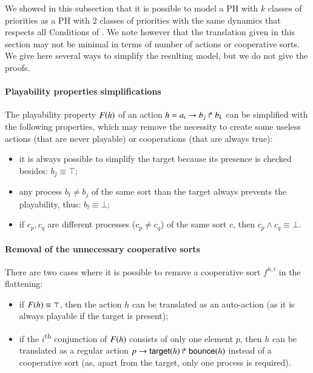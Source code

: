 We showed in this subsection that it is possible to model a PH with $k$ classes of priorities as a PH
with $2$ classes of priorities with the same dynamics that respects all Conditions of .
We note however that the translation given in this section may not be minimal in terms of number of actions
or cooperative sorts.
We give here several ways to simplify the resulting model, but we do not give the proofs.

\paragraph{Playability properties simplifications}
The playability property $F(h)$ of an action $h = a_i\rightarrow b_j\Rsh b_k$ can be simplified with the following properties,
which may remove the necessity to create some useless actions (that are never playable) or cooperations (that are always true):
\begin{itemize}
  \item it is always possible to simplify the target because its presence is checked besides: $b_j \equiv \top$;
  \item any process $b_l \neq b_j$ of the same sort than the target always prevents the playability, thus: $b_l \equiv \bot$;
  \item if $c_p, c_q$ are different processes ($c_p \neq c_q$) of the same sort $c$, then $c_p \wedge c_q \equiv \bot$.
\end{itemize}

\paragraph{Removal of the unnecessary cooperative sorts}
There are two cases where it is possible to remove a cooperative sort $f^{h,i}$ in the flattening:
\begin{itemize}
  \item if $F(h) \equiv \top$, then the action $h$ can be translated as an auto-action
    (as it is always playable if the target is present);
  \item if the $i$\textsuperscript{th} conjunction of $F(h)$ consists of only one element $p$,
    then $h$ can be translated as a regular action $p\rightarrow\mathsf{target}(h)\Rsh\mathsf{bounce}(h)$ instead of a cooperative sort
    (as, apart from the target, only one process is required).
\end{itemize}
